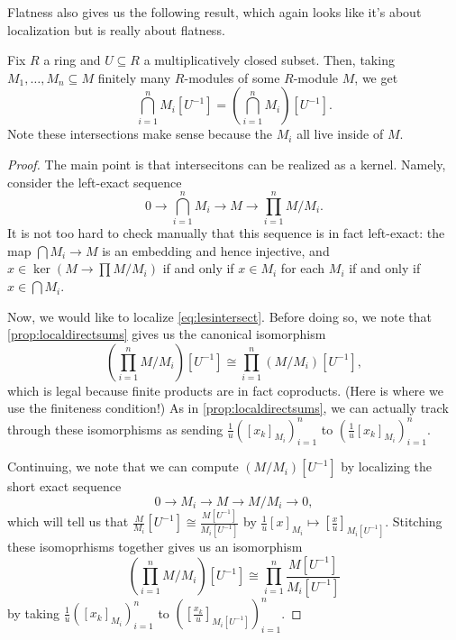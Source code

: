Flatness also gives us the following result, which again looks like it's about localization but is really about flatness.
\begin{corollary}
	Fix $R$ a ring and $U\subseteq R$ a multiplicatively closed subset. Then, taking $M_1,\ldots,M_n\subseteq M$ finitely many $R$-modules of some $R$-module $M$, we get
	\[\bigcap_{i=1}^nM_i\left[U^{-1}\right]=\left(\bigcap_{i=1}^nM_i\right)\left[U^{-1}\right].\]
	Note these intersections make sense because the $M_i$ all live inside of $M$.
\end{corollary}
\begin{proof}
	The main point is that intersecitons can be realized as a kernel. Namely, consider the left-exact sequence
	\[0\to\bigcap_{i=1}^nM_i\to M\to\prod_{i=1}^nM/M_i.\tag{$*$}\label{eq:lesintersect}\]
	It is not too hard to check manually that this sequence is in fact left-exact: the map $\bigcap M_i\to M$ is an embedding and hence injective, and $x\in\ker\left(M\to\prod M/M_i\right)$ if and only if $x\in M_i$ for each $M_i$ if and only if $x\in\bigcap M_i$.
	
	Now, we would like to localize \autoref{eq:lesintersect}. Before doing so, we note that \autoref{prop:localdirectsums} gives us the canonical isomorphism
	\[\left(\prod_{i=1}^nM/M_i\right)[U^{-1}]\cong\prod_{i=1}^n(M/M_i)\left[U^{-1}\right],\]
	which is legal because finite products are in fact coproducts. (Here is where we use the finiteness condition!) As in \autoref{prop:localdirectsums}, we can actually track through these isomorphisms as sending $\frac1u([x_k]_{M_i})_{i=1}^n$ to $\left(\frac1u[x_k]_{M_i}\right)_{i=1}^n$.
	
	Continuing, we note that we can compute $(M/M_i)\left[U^{-1}\right]$ by localizing the short exact sequence
	\[0\to M_i\to M\to M/M_i\to 0,\]
	which will tell us that $\frac M{M_i}\left[U^{-1}\right]\cong\frac{M\left[U^{-1}\right]}{M_i\left[U^{-1}\right]}$ by $\frac1u[x]_{M_i}\mapsto\left[\frac xu\right]_{M_i\left[U^{-1}\right]}$. Stitching these isomoprhisms together gives us an isomorphism
	\[\left(\prod_{i=1}^nM/M_i\right)[U^{-1}]\cong\prod_{i=1}^n\frac{M\left[U^{-1}\right]}{M_i\left[U^{-1}\right]}\]
	by taking $\frac1u\left([x_k]_{M_i}\right)_{i=1}^n$ to $\left([\frac{x_k}u]_{M_i\left[U^{-1}\right]}\right)_{i=1}^n$.


\end{proof}
